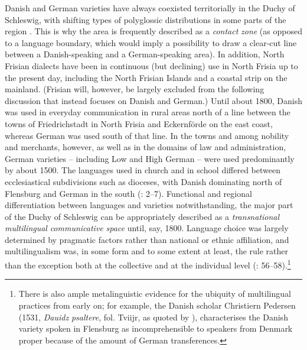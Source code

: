 \documentclass[output=paper]{langsci/langscibook}
\begin{document}
Danish and German varieties have always coexisted territorially in the Duchy of Schleswig, with shifting types of polyglossic distributions in some parts of the region \citep{Winge.2004}. This is why the area is frequently described as a \textit{contact} \textit{zone} (as opposed to a language boundary, which would imply a possibility to draw a clear-cut line between a Danish-speaking and a German-speaking area). In addition, North Frisian dialects have been in continuous (but declining) use in North Frisia up to the present day, including the North Frisian Islands and a coastal strip on the mainland. (Frisian will, however, be largely excluded from the following discussion that instead focuses on Danish and German.) Until about 1800, Danish was used in everyday communication in rural areas north of a line between the towns of Friedrichstadt in North Frisia and Eckernförde on the east coast, whereas German was used south of that line. In the towns and among nobility and merchants, however, as well as in the domains of law and administration, German varieties – including Low and High German – were used predominantly by about 1500. The languages used in church and in school differed between ecclesiastical subdivisions such as dioceses, with Danish dominating north of Flensburg and German in the south (\citealt{Fredsted.2009}: 2–7). Functional and regional differentiation between languages and varieties notwithstanding, the major part of the Duchy of Schleswig can be appropriately described as a \textit{transnational} \textit{multilingual} \textit{communicative} \textit{space} until, say, 1800. Language choice was largely determined by pragmatic factors rather than national or ethnic affiliation, and multilingualism was, in some form and to some extent at least, the rule rather than the exception both at the collective and at the individual level (\citealt{Hoder.2019}: 56–58).\footnote{There is also ample metalinguistic evidence for the ubiquity of multilingual practices from early on; for example, the Danish scholar Christiern Pedersen (1531, \textit{Dauidz} \textit{psaltere}, fol. Tviijr, as quoted by \citealt[162]{Skautrup.1947}), characterises the Danish variety spoken in Flensburg as incomprehensible to speakers from Denmark proper because of the amount of German transferences.}
\end{document}

